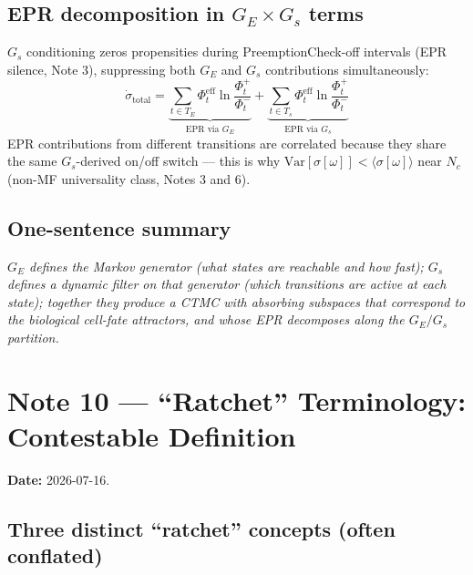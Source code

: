 \documentclass[11pt,a4paper]{article}
\begin{document}
\subsection*{EPR decomposition in $G_E \times G_s$ terms}

$G_s$ conditioning zeros propensities during PreemptionCheck-off
intervals (EPR silence, Note 3), suppressing both $G_E$ and $G_s$
contributions simultaneously:
\begin{equation}
\dot\sigma_{\mathrm{total}}
  = \underbrace{\sum_{t \in T_E} \Phi_t^{\mathrm{eff}}
      \ln \frac{\Phi_t^+}{\Phi_t^-}}_{\text{EPR via } G_E}
  + \underbrace{\sum_{t \in T_s} \Phi_t^{\mathrm{eff}}
      \ln \frac{\Phi_t^+}{\Phi_t^-}}_{\text{EPR via } G_s}
\end{equation}
EPR contributions from different transitions are correlated because
they share the same $G_s$-derived on/off switch ---
this is why $\mathrm{Var}[\sigma[\omega]] < \langle\sigma[\omega]\rangle$
near $N_c$ (non-MF universality class, Notes 3 and 6).

\subsection*{One-sentence summary}

\emph{$G_E$ defines the Markov generator (what states are reachable and
how fast); $G_s$ defines a dynamic filter on that generator (which
transitions are active at each state); together they produce a CTMC with
absorbing subspaces that correspond to the biological cell-fate attractors,
and whose EPR decomposes along the $G_E / G_s$ partition.}

\section*{Note 10 — ``Ratchet'' Terminology: Contestable Definition}

\textbf{Date:} 2026-07-16.

\subsection*{Three distinct ``ratchet'' concepts (often conflated)}
\end{document}
